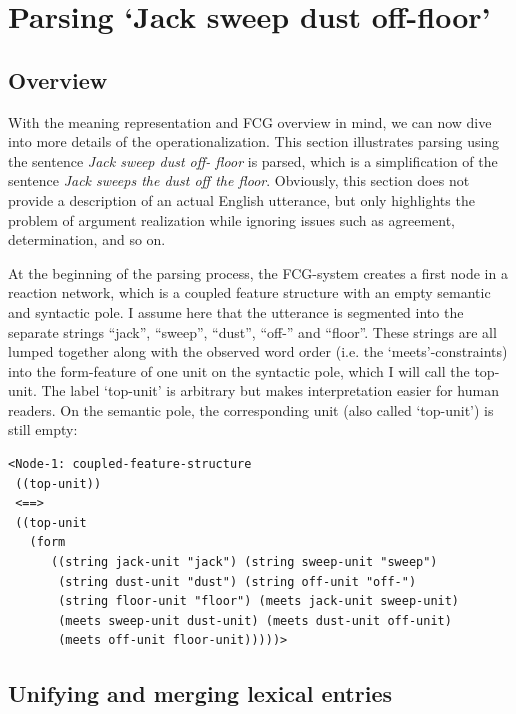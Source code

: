 \section{Parsing `Jack sweep dust off-floor'}

\subsection{Overview}
With the meaning representation and FCG overview in mind, we can now dive into more details of the operationalization. This section illustrates parsing using the sentence {\em Jack sweep dust off- floor} is parsed, which is a simplification of the sentence {\em Jack sweeps the dust off the floor}. Obviously, this section does not provide a description of an actual English utterance, but only highlights the problem of argument realization while ignoring issues such as agreement, determination, and so on.

At the beginning of the parsing process, the FCG-system creates a first node in a reaction network, which is a coupled feature structure with an empty semantic and syntactic pole. I assume here that the utterance is segmented into the separate strings ``jack'', ``sweep'', ``dust'', ``off-'' and ``floor''. These strings are all lumped together along with the observed word order (i.e. the `meets'-constraints) into the form-feature of one unit on the syntactic pole, which I will call the top-unit. The label `top-unit' is arbitrary but makes interpretation easier for human readers. On  the semantic pole, the corresponding unit (also called `top-unit') is still empty:

\ea
\begin{lstlisting}
<Node-1: coupled-feature-structure
 ((top-unit))
 <==>
 ((top-unit
   (form 
      ((string jack-unit "jack") (string sweep-unit "sweep")
       (string dust-unit "dust") (string off-unit "off-")
       (string floor-unit "floor") (meets jack-unit sweep-unit)
       (meets sweep-unit dust-unit) (meets dust-unit off-unit)
       (meets off-unit floor-unit)))))> 
\end{lstlisting}
\z

\subsection{Unifying and merging lexical entries}
\label{s:example-parsing}

